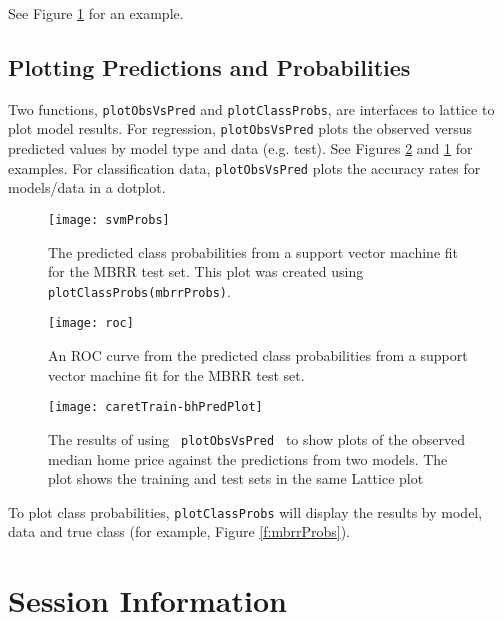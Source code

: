 \documentclass[12pt]{article}
\begin{document}
See Figure \ref{f:mbrrROC} for an example.

\subsection*{Plotting Predictions and Probabilities}

Two functions, \texttt{plotObsVsPred} and \texttt{plotClassProbs}, are interfaces to lattice to plot model results. For regression, \texttt{plotObsVsPred} plots the observed versus predicted values by model type and data (e.g. test). See Figures \ref{f:bhPredPlot} and \ref{f:mbrrROC}  for examples. For classification data, \texttt{plotObsVsPred} plots the accuracy rates for models/data in a dotplot. 



\begin{figure}[ht]
   \begin{center}      
      \texttt{[image: svmProbs]}   
      \caption{The predicted class probabilities from a support vector machine fit for the MBRR test set. This plot was created using \texttt{plotClassProbs(mbrrProbs)}.}
      \label{f:mbrrProbs}         
      \vspace*{.5 in}      
       \texttt{[image: roc]}   
      \caption{An ROC curve from the predicted class probabilities from a support vector machine fit for the MBRR test set. }
      \label{f:mbrrROC}       
   \end{center}
\end{figure}  

\begin{figure}
   \begin{center}      
\texttt{[image: caretTrain-bhPredPlot]}
      \caption{The results of using \texttt{ plotObsVsPred } to show plots of the observed median home price against the predictions from two models. The plot shows the training and test sets in the same Lattice plot}
      \label{f:bhPredPlot}         
   \end{center}
\end{figure}


To plot class probabilities, \texttt{plotClassProbs} will display the results by model, data and true class (for example, Figure \ref{f:mbrrProbs}).     


\section{Session Information}
\end{document}
